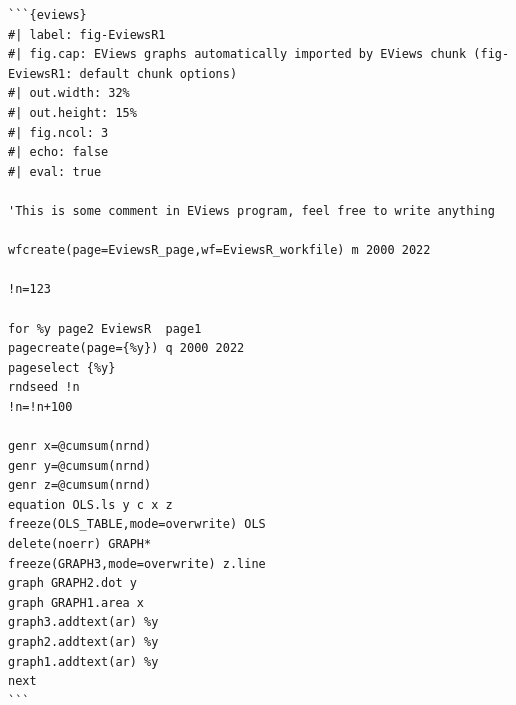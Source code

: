\begin{verbatim}
```{eviews} 
#| label: fig-EviewsR1
#| fig.cap: EViews graphs automatically imported by EViews chunk (fig-EviewsR1: default chunk options)
#| out.width: 32%
#| out.height: 15%
#| fig.ncol: 3
#| echo: false
#| eval: true

'This is some comment in EViews program, feel free to write anything

wfcreate(page=EviewsR_page,wf=EviewsR_workfile) m 2000 2022

!n=123

for %y page2 EviewsR  page1 
pagecreate(page={%y}) q 2000 2022
pageselect {%y}
rndseed !n
!n=!n+100

genr x=@cumsum(nrnd)
genr y=@cumsum(nrnd)
genr z=@cumsum(nrnd)
equation OLS.ls y c x z
freeze(OLS_TABLE,mode=overwrite) OLS
delete(noerr) GRAPH*
freeze(GRAPH3,mode=overwrite) z.line
graph GRAPH2.dot y
graph GRAPH1.area x
graph3.addtext(ar) %y
graph2.addtext(ar) %y
graph1.addtext(ar) %y
next
``` 
\end{verbatim}


